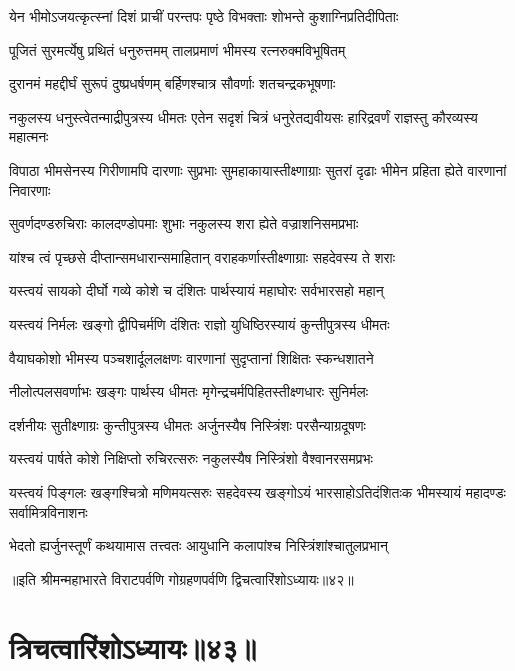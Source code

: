 \twolineshloka
{येन भीमोऽजयत्कृत्स्नां दिशं प्राचीं परन्तपः}
{पृष्ठे विभक्ताः शोभन्ते कुशाग्निप्रतिदीपिताः}


\twolineshloka
{पूजितं सुरमर्त्येषु प्रथितं धनुरुत्तमम्}
{तालप्रमाणं भीमस्य रत्नरुक्मविभूषितम्}


\twolineshloka
{दुरानमं महद्दीर्घं सुरूपं दुष्प्रधर्षणम्}
{बर्हिणश्चात्र सौवर्णाः शतचन्द्रकभूषणाः}


\threelineshloka
{नकुलस्य धनुस्त्वेतन्माद्रीपुत्रस्य धीमतः}
{एतेन सदृशं चित्रं धनुरेतद्यवीयसः}
{हारिद्रवर्णं राज्ञस्तु कौरव्यस्य महात्मनः}


\threelineshloka
{विपाठा भीमसेनस्य गिरीणामपि दारणाः}
{सुप्रभाः सुमहाकायास्तीक्ष्णाग्राः सुतरां दृढाः}
{भीमेन प्रहिता ह्येते वारणानां निवारणाः}


\twolineshloka
{सुवर्णदण्डरुचिराः कालदण्डोपमाः शुभाः}
{नकुलस्य शरा ह्येते वज्राशनिसमप्रभाः}


\twolineshloka
{यांश्च त्वं पृच्छसे दीप्तान्समधारान्समाहितान्}
{वराहकर्णास्तीक्ष्णाग्राः सहदेवस्य ते शराः}


\twolineshloka
{यस्त्वयं सायको दीर्घो गव्ये कोशे च दंशितः}
{पार्थस्यायं महाघोरः सर्वभारसहो महान्}


\twolineshloka
{यस्त्वयं निर्मलः खङ्गो द्वीपिचर्मणि दंशितः}
{राज्ञो युधिष्ठिरस्यायं कुन्तीपुत्रस्य धीमतः}



\twolineshloka
{वैयाघकोशो भीमस्य पञ्चशार्दूललक्षणः}
{वारणानां सुदृप्तानां शिक्षितः स्कन्धशातने}


\twolineshloka
{नीलोत्पलसवर्णाभः खङ्गः पार्थस्य धीमतः}
{मृगेन्द्रचर्मपिहितस्तीक्ष्णधारः सुनिर्मलः}


\twolineshloka
{दर्शनीयः सुतीक्ष्णाग्रः कुन्तीपुत्रस्य धीमतः}
{अर्जुनस्यैष निस्त्रिंशः परसैन्याग्रदूषणः}


\twolineshloka
{यस्त्वयं पार्षते कोशे निक्षिप्तो रुचिरत्सरुः}
{नकुलस्यैष निस्त्रिंशो वैश्वानरसमप्रभः}


\threelineshloka
{यस्त्वयं पिङ्गलः खङ्गश्चित्रो मणिमयत्सरुः}
{सहदेवस्य खङ्गोऽयं भारसाहोऽतिदंशितःक}
{भीमस्यायं महादण्डः सर्वामित्रविनाशनः}



\twolineshloka
{भेदतो ह्यर्जुनस्तूर्णं कथयामास तत्त्वतः}
{आयुधानि कलापांश्च निस्त्रिंशांश्चातुलप्रभान्}

॥इति श्रीमन्महाभारते विराटपर्वणि गोग्रहणपर्वणि द्विचत्वारिंशोऽध्यायः॥४२॥

\chapter{त्रिचत्वारिंशोऽध्यायः॥४३॥}

